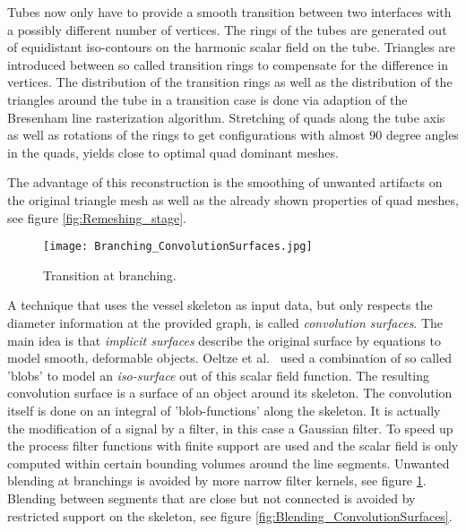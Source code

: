 Tubes now only have to provide a smooth transition between two interfaces with a possibly different number of vertices. The rings of the tubes are generated out of equidistant iso-contours on the harmonic scalar field on the tube. Triangles are introduced between so called transition rings to compensate for the difference in vertices. The distribution of the transition rings as well as the distribution of the triangles around the tube in a transition case is done via adaption of the Bresenham line rasterization algorithm. Stretching of quads along the tube axis as well as rotations of the rings to get configurations with almost $90$ degree angles in the quads, yields close to optimal quad dominant meshes. 

The advantage of this reconstruction is the smoothing of unwanted artifacts on the original triangle mesh as well as the already shown properties of quad meshes, see figure \ref{fig:Remeshing_stage}.


\begin{figure}[h]
	\centering
	\texttt{[image: Branching\_ConvolutionSurfaces.jpg]} \\
	\caption{Transition at branching.}
	\cite{oeltze2005visualization}
	\label{fig:Branching_ConvolutionSurfaces}
\end{figure}

A technique that uses the vessel skeleton as input data, but only respects the diameter information at the provided graph, is called \emph{convolution surfaces}. The main idea is that \emph{implicit surfaces} describe the original surface by equations to model smooth, deformable objects. Oeltze et al.~\cite{oeltze2005visualization} used a combination of so called 'blobs' to model an \emph{iso-surface} out of this scalar field function.
The resulting convolution surface is a surface of an object around its skeleton. The convolution itself is done on an integral of 'blob-functions' along the skeleton. It is actually the modification of a signal by a filter, in this case a Gaussian filter. To speed up the process filter functions with finite support are used and the scalar field is only computed within certain bounding volumes around the line segments. Unwanted blending at branchings is avoided by more narrow filter kernels, see figure \ref{fig:Branching_ConvolutionSurfaces}. Blending between segments that are close but not connected is avoided by restricted support on the skeleton, see figure \ref{fig:Blending_ConvolutionSurfaces}.

